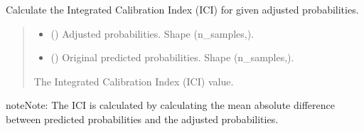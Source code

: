 \documentclass[letterpaper,10pt,english]{sphinxmanual}
\begin{document}
\begin{fulllineitems}
\label{\detokenize{calzone:calzone.metrics.cal_ICI}}
\pysigstartsignatures
{}
\pysigstopsignatures
\sphinxAtStartPar
Calculate the Integrated Calibration Index (ICI) for given adjusted probabilities.
\begin{quote}\begin{description}
\begin{itemize}
\item {} 
\sphinxAtStartPar
{} () \textendash{} Adjusted probabilities. Shape (n\_samples,).

\item {} 
\sphinxAtStartPar
{} () \textendash{} Original predicted probabilities. Shape (n\_samples,).

\end{itemize}

\sphinxAtStartPar
{} \textendash{} The Integrated Calibration Index (ICI) value.

\end{description}\end{quote}

\begin{sphinxadmonition}{note}{Note:}
\sphinxAtStartPar
The ICI is calculated by calculating the mean absolute difference between
predicted probabilities and the adjusted probabilities.
\end{sphinxadmonition}

\end{fulllineitems}

\end{document}
